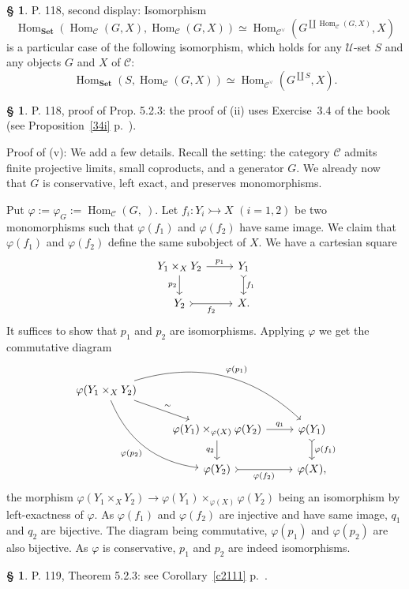 \documentclass[12pt]{article}%
\theoremstyle{remark}
\theoremstyle{definition}
\newtheorem{s}[thm]{\S}%
\newcommand{\C}{\mathcal C}
\newcommand{\U}{\mathcal U}
\newcommand{\Set}{\mathbf{Set}}
\newcommand{\pp}{\varphi}
\newcommand{\mono}{\rightarrowtail}%
\DeclareMathOperator{\Hom}{Hom}%
\begin{document}
%

\begin{s}
P. 118, second display: Isomorphism 
$$
\Hom_{\Set}(\Hom_\C(G,X),\Hom_\C(G,X))\simeq\Hom_{\C^\vee}(G^{\coprod\Hom_\C(G,X)},X)
$$ 
is a particular case of the following isomorphism, which holds for any $\U$-set $S$ and any objects $G$ and $X$ of $\C$: 
$$
\Hom_{\Set}(S,\Hom_\C(G,X))\simeq\Hom_{\C^\vee}(G^{\coprod S},X).
$$ 
\end{s}

%

\begin{s}
P. 118, proof of Prop. 5.2.3: the proof of (ii) uses Exercise~3.4 of the book (see Proposition~\ref{34i} p.~\pageref{34i}). 

Proof of (v): We add a few details. Recall the setting: the category $\C$ admits finite projective limits, small coproducts, and a generator $G$. We already now that $G$ is conservative, left exact, and preserves monomorphisms. 

Put $\pp:=\pp_G:=\Hom_\C(G,\ )$. Let $f_i:Y_i\mono X$ $(i=1,2)$ be two monomorphisms such that $\pp(f_1)$ and $\pp(f_2)$ have same image. We claim that $\pp(f_1)$ and $\pp(f_2)$ define the same subobject of $X$. We have a cartesian square
$$
\begin{tikzcd}
Y_1\times_XY_2\ar{r}{p_1}\ar{d}[swap]{p_2}&Y_1\ar[tail]{d}{f_1}\\ 
Y_2\ar[tail]{r}[swap]{f_2}&X.
\end{tikzcd}
$$ 
It suffices to show that $p_1$ and $p_2$ are isomorphisms. Applying $\pp$ we get the commutative diagram 
$$
\begin{tikzcd}
\pp(Y_1\times_XY_2)\ar{rd}{\sim}\ar[bend left]{rrd}{\pp(p_1)}\ar[bend right]{rdd}[swap]{\pp(p_2)}\\ 
{}&\pp(Y_1)\times_{\pp(X)}\pp(Y_2)\ar{r}{q_1}\ar{d}[swap]{q_2}&\pp(Y_1)\ar[tail]{d}{\pp(f_1)}\\ 
{}&\pp(Y_2)\ar[tail]{r}[swap]{\pp(f_2)}&\pp(X),
\end{tikzcd}
$$ 
the morphism $\pp(Y_1\times_XY_2)\to\pp(Y_1)\times_{\pp(X)}\pp(Y_2)$ being an isomorphism by left-exactness of $\pp$. As $\pp(f_1)$ and $\pp(f_2)$ are injective and have same image, $q_1$ and $q_2$ are bijective. The diagram being commutative, $\pp(p_1)$ and $\pp(p_2)$ are also bijective. As $\pp$ is conservative,  $p_1$ and $p_2$ are indeed isomorphisms.
\end{s}

%

\begin{s}
P. 119, Theorem 5.2.3: see Corollary~\ref{c2111} p.~\pageref{c2111}.
\end{s}
\end{document}
